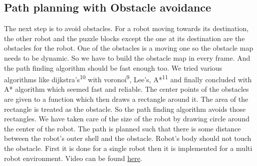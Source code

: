\documentclass[a4paper,12pt,oneside]{book}
\begin{document}
\subsection*{Path planning with Obstacle avoidance}
The next step is to avoid obstacles. For a robot moving towards its destination, the other robot and the puzzle blocks except the one at its destination are the obstacles for the robot. One of the obstacles is a moving one so the obstacle map needs to be dynamic. So we have to build the obstacle map in every frame. And the path finding algorithm should be fast enough too. We tried various algorithms like dijkstra's\textsuperscript{10} with voronoi\textsuperscript{9}, Lee's, A*\textsuperscript{11} and finally concluded with A* algorithm which seemed fast and reliable. The center points of the obstacles are given to a function which then draws a rectangle around it. The area of the rectangle is treated as the obstacle. So the path finding algorithm avoids those rectangles. We have taken care of the size of the robot by drawing circle around the center of the robot. The path is planned such that there is some distance between the robot's outer shell and the obstacle. Robot's body should not touch the obstacle. First it is done for a single robot then it is implemented for a multi robot environment. Video can be found \href{}{here}.
\end{document}
